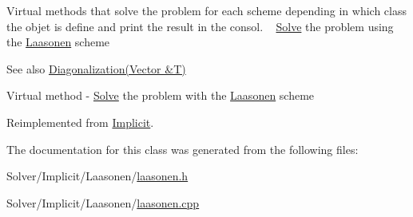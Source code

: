 Virtual methods that solve the problem for each scheme depending in which class the objet is define and print the result in the consol. ~\newline
 \hyperlink{class_solve}{Solve} the problem using the \hyperlink{class_laasonen}{Laasonen} scheme \begin{DoxySeeAlso}{See also}
\hyperlink{class_implicit_a572fff2232977c83c432f993f37a7853}{Diagonalization(\+Vector \&\+T)}
\end{DoxySeeAlso}
Virtual method -\/ \hyperlink{class_solve}{Solve} the problem with the \hyperlink{class_laasonen}{Laasonen} scheme 

Reimplemented from \hyperlink{class_implicit_a027adb4276376991f75fcffbd34740b3}{Implicit}.



The documentation for this class was generated from the following files\+:\begin{DoxyCompactItemize}
\item 
Solver/\+Implicit/\+Laasonen/\hyperlink{laasonen_8h}{laasonen.\+h}\item 
Solver/\+Implicit/\+Laasonen/\hyperlink{laasonen_8cpp}{laasonen.\+cpp}\end{DoxyCompactItemize}
